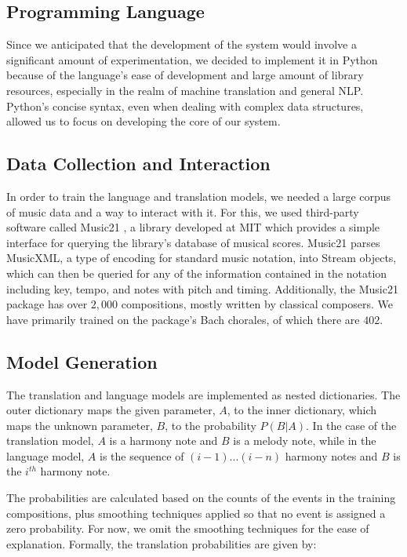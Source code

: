 \documentclass{sig-alternate}
\begin{document}
\subsection{Programming Language}
Since we anticipated that the development of the system would involve a significant amount of experimentation, we decided to implement it in Python because of the language's ease of development and large amount of library resources, especially in the realm of machine translation and general NLP. Python's concise syntax, even when dealing with complex data structures, allowed us to focus on developing the core of our system.

\subsection{Data Collection and Interaction}
In order to train the language and translation models, we needed a large corpus of music data and a way to interact with it. For this,
we used third-party software called Music21 \cite{Cuthbert_music21:a}, a library developed at MIT which provides a simple interface for querying the library's database of musical scores. Music21 parses MusicXML, a type of encoding for standard music notation, into Stream objects, which can then be queried for any of the information contained in the notation including key, tempo, and notes with pitch and timing. Additionally, the Music21 package has over $2,000$ compositions, mostly written by classical composers. We have primarily trained on the package's Bach chorales, of which there are $402$.

\subsection{Model Generation}
The translation and language models are implemented as nested dictionaries. The outer dictionary maps the given parameter, $A$, to the inner dictionary, which maps the unknown parameter, $B$, to the probability $P(B | A)$. In the case of the translation model, $A$ is a harmony note and $B$ is a melody note, while in the language model, $A$ is the sequence of $(i - 1) ... (i - n)$ harmony notes and $B$ is the $i^{th}$ harmony note.

The probabilities are calculated based on the counts of the events in the training compositions, plus smoothing techniques applied so that no event is assigned a zero probability. For now, we omit the smoothing techniques for the ease of explanation. Formally, the translation probabilities are given by:\\
\end{document}
